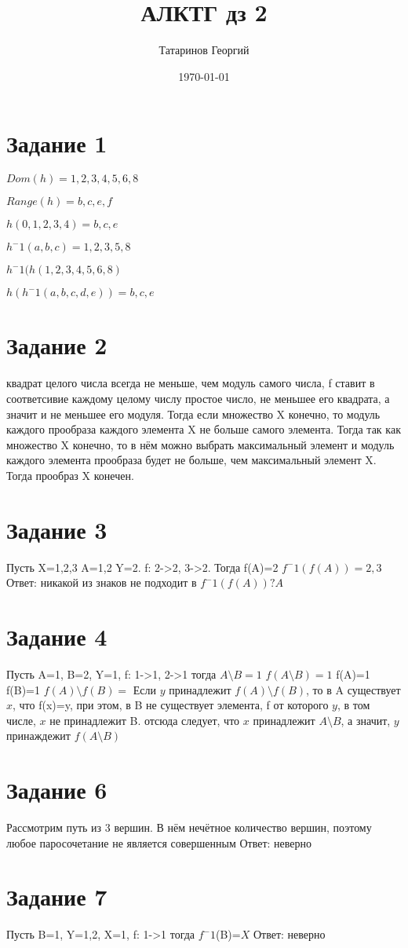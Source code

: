\documentclass[a4paper, 12pt]{article}
\title{АЛКТГ дз 2}
\author{Татаринов Георгий}
\date{\today}
\begin{document}
	\section*{Задание 1}
		$Dom(h)={1,2,3,4,5,6,8}$\par
		$Range(h)={b,c,e,f}$\par
		$h({0,1,2,3,4})={b,c,e}$\par
		$h^-1({a,b,c})={1,2,3,5,8}$\par
		$h^-1(h({1,2,3,4,5,6,8})$\par
		$h(h^-1({a,b,c,d,e}))={b,c,e}$\par
	\section*{Задание 2}
		квадрат целого числа всегда не меньше, чем модуль самого числа, f ставит в соответсивие каждому целому числу простое число, не меньшее его квадрата, а значит и не меньшее его модуля. Тогда если множество X конечно, то модуль каждого прообраза каждого элемента X не больше самого элемента. Тогда так как множество X конечно, то в нём можно выбрать максимальный элемент и модуль каждого элемента прообраза будет не больше, чем максимальный элемент X. Тогда прообраз X конечен.
	\section*{Задание 3}
		Пусть X={1,2,3} A={1,2} Y={2}. f: 2->2, 3->2.
		Тогда f(A)={2}
		$f^-1(f(A))={2,3}$
		Ответ: никакой из знаков не подходит в $f^-1(f(A))?A$
	\section*{Задание 4}
		Пусть A={1}, B={2}, Y={1}, f: 1->1, 2->1
		тогда
		$A\setminus B={1}$
		$f(A\setminus B)={1}$
		f(A)={1}
		f(B)={1}
		$f(A)\setminus f(B)={}$
		Если $y$ принадлежит $f(A)\setminus f(B)$, то в A существует $x$, что f(x)=y, при этом, в B не существует элемента, f от которого $y$, в том числе, $x$ не принадлежит B. отсюда следует, что $x$ принадлежит $A\setminus B$, а значит, $y$ принаждежит $f(A\setminus B)$
	\section*{Задание 6}
		Рассмотрим путь из 3 вершин. В нём нечётное количество вершин, поэтому любое паросочетание не является совершенным
		Ответ: неверно
	\section*{Задание 7}
		Пусть B={1}, Y={1,2}, X={1}, f: 1->1
		тогда $f^-1$(B)=$X$
		Ответ: неверно
\end{document}
